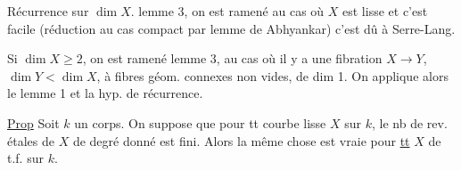 Récurrence sur $\dim X$.
lemme 3, on est ramené au cas où $X$ est lisse et
c'est facile (réduction au cas compact par lemme de Abhyankar)
c'est dû à Serre-Lang.

Si $\dim X\geq2$, on est ramené 
lemme 3, au cas où il y a une fibration  $X\to Y$, $\dim Y<\dim X$, 
 à fibres géom. connexes non vides, de dim 1.
On applique alors le lemme 1 et la hyp. de récurrence.

\uline{Prop} Soit $k$ un corps. On suppose que pour tt 
courbe  lisse $X$ sur $k$, le nb de rev. étales de $X$ de degré donné est fini.
Alors la même chose est vraie pour \uline{tt} $X$ de t.f. sur $k$.
